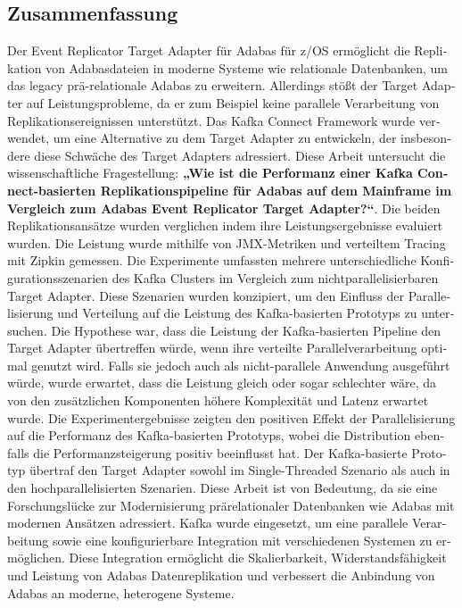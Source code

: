 \begin{otherlanguage}{ngerman}
	\chapter*{Zusammenfassung}
    Der Event Replicator Target Adapter für Adabas für z/OS ermöglicht die Replikation von Adabasdateien in moderne Systeme wie relationale Datenbanken, um das legacy prä-relationale Adabas zu erweitern. Allerdings stößt der Target Adapter auf Leistungsprobleme, da er zum Beispiel keine parallele Verarbeitung von Replikationsereignissen unterstützt. Das Kafka Connect Framework wurde verwendet, um eine Alternative zu dem Target Adapter zu entwickeln, der insbesondere diese Schwäche des Target Adapters adressiert.
    Diese Arbeit untersucht die wissenschaftliche Fragestellung: \textbf{„Wie ist die Performanz einer Kafka Connect-basierten Replikationspipeline für Adabas auf dem Mainframe im Vergleich zum Adabas Event Replicator Target Adapter?“}. Die beiden Replikationsansätze wurden verglichen indem ihre Leistungsergebnisse evaluiert wurden. Die Leistung wurde mithilfe von JMX-Metriken und verteiltem Tracing mit Zipkin gemessen. Die Experimente umfassten mehrere unterschiedliche Konfigurationsszenarien des Kafka Clusters im Vergleich zum nichtparallelisierbaren Target Adapter. Diese Szenarien wurden konzipiert, um den Einfluss der Parallelisierung und Verteilung auf die Leistung des Kafka-basierten Prototyps zu untersuchen.
    Die Hypothese war, dass die Leistung der Kafka-basierten Pipeline den Target Adapter übertreffen würde, wenn ihre verteilte Parallelverarbeitung optimal genutzt wird. Falls sie jedoch auch als nicht-parallele Anwendung ausgeführt würde, wurde erwartet, dass die Leistung gleich oder sogar schlechter wäre, da von den zusätzlichen Komponenten höhere Komplexität und Latenz erwartet wurde. Die Experimentergebnisse zeigten den positiven Effekt der Parallelisierung auf die Performanz des Kafka-basierten Prototyps, wobei die Distribution ebenfalls die Performanzsteigerung positiv beeinflusst hat. Der Kafka-basierte Prototyp übertraf den Target Adapter sowohl im Single-Threaded Szenario als auch in den hochparallelisierten Szenarien.
    Diese Arbeit ist von Bedeutung, da sie eine Forschungslücke zur Modernisierung prärelationaler Datenbanken wie Adabas mit modernen Ansätzen adressiert. Kafka wurde eingesetzt, um eine parallele Verarbeitung sowie eine konfigurierbare Integration mit verschiedenen Systemen zu ermöglichen. Diese Integration ermöglicht die Skalierbarkeit, Widerstandsfähigkeit und Leistung von Adabas Datenreplikation und verbessert die Anbindung von Adabas an moderne, heterogene Systeme.

\end{otherlanguage}
